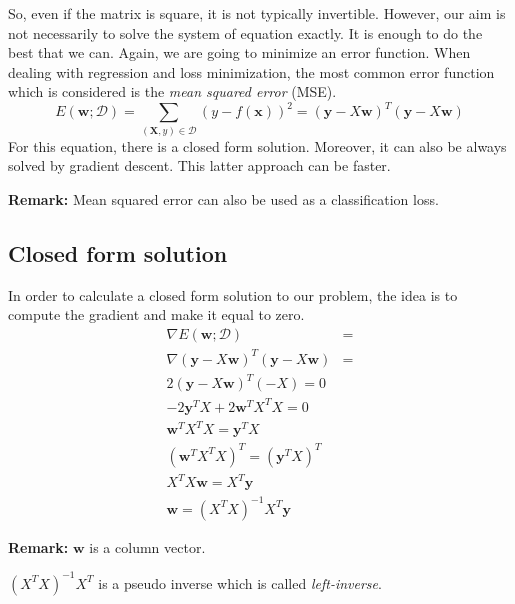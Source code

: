 So, even if the matrix is square, it is not typically invertible. However, our aim
is not necessarily to solve the system of equation exactly. It is enough to do
the best that we can. Again, we are going to minimize an error function. When dealing
with regression and loss minimization, the most common error function which is
considered is the \textit{mean squared error} (MSE).
\begin{equation}
	E(\pmb{w}; \mathcal{D}) = \sum_{(\pmb{X},y) \in \mathcal{D}}(y-f(\pmb{x}))^{2}=
	(\pmb{y}-X\pmb{w})^{T}(\pmb{y}- X \pmb{w})
\end{equation}
For this equation, there is a closed form solution. Moreover, it can also be always
solved by gradient descent. This latter approach can be faster.
\newline

\textbf{Remark:} Mean squared error can also be used as a classification loss.

\subsection{Closed form solution}
In order to calculate a closed form solution to our problem, the idea is to
compute the gradient and make it equal to zero.
\begin{align*}
	\nabla E(\pmb{w}; \mathcal{D})                     & = \\
	\nabla (\pmb{y}-X \pmb{w})^{T}(\pmb{y}- X \pmb{w}) & = \\
	2(\pmb{y}-X \pmb{w})^{T}(-X) = 0                    \\
	-2 \pmb{y}^{T}X + 2\pmb{w}^{T}X^{T}X = 0            \\
	\pmb{w}^{T}X^{T}X = \pmb{y}^{T}X                    \\
	(\pmb{w}^{T}X^{T}X)^{T}= (\pmb{y}^{T}X)^{T}         \\
	X^{T}X \pmb{w}= X^{T}\pmb{y}                        \\
	\pmb{w}= (X^{T}X)^{-1}X^{T}\pmb{y}
\end{align*}

\textbf{Remark:} $\pmb{w}$ is a column vector.
\newline

$(X^{T}X)^{-1}X^{T}$ is a pseudo inverse which is called \textit{left-inverse}.
\newline

